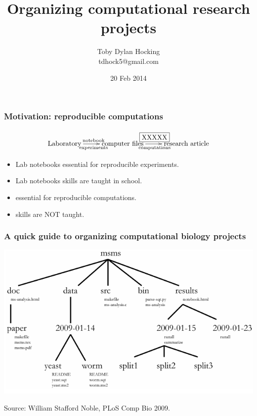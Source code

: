 \documentclass{beamer}
\begin{document}
\title{Organizing computational research projects}
\author{
Toby Dylan Hocking\\
tdhock5@gmail.com
}

\date{20 Feb 2014}

\maketitle

\begin{frame}
  \frametitle{Motivation: reproducible computations}
  \begin{displaymath}
\xymatrix{
  \text{Laboratory}
  \ar[r]^{\text{notebook}}_{\text{experiments}}
&
  \text{computer files}
  \ar[r]^{\fbox{\text{XXXXX}}}_{\text{computations}}
  &
  \text{research article}
}
  \end{displaymath}
  \begin{itemize}
  \item Lab notebooks essential for reproducible experiments.
  \item Lab notebooks skills are taught in school.
  \item {} essential for reproducible computations.
  \item {} skills are NOT taught.
  \end{itemize}
\end{frame}

\begin{frame}
  \frametitle{A quick guide to organizing computational biology
    projects}
  \includegraphics[width=\textwidth]{figure-noble-directories-nohilite}

  Source: William Stafford Noble, PLoS Comp Bio 2009.
\end{frame}
\end{document}
